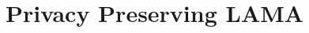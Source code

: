 \documentclass[letterpaper]{article}
\theoremstyle{definition}
\begin{document}

\section{Privacy Preserving LAMA}
\end{document}
